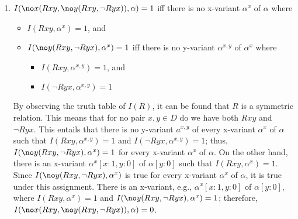 \begin{enumerate}
\item
$I(\no x (Rxy, \no y (Rxy, \neg Ryx)), \alpha) = 1$ iff there is no x-variant $\alpha^x$ of $\alpha$ where
\vspace{-\parskip}
\begin{itemize}[noitemsep, leftmargin=*]
\item $I(Rxy, \alpha^x) = 1$, and
\item $I(\no y (Rxy, \neg Ryx), \alpha^x) = 1$ iff there is no y-variant $\alpha^{x,y}$ of $\alpha^x$ where
   \begin{itemize}[topsep=-\parskip, noitemsep, leftmargin=*]
   \item $I(Rxy, \alpha^{x,y}) = 1$, and
   \item $I(\neg Ryx, \alpha^{x,y}) = 1$
   \end{itemize}
\end{itemize}
By observing the truth table of $I(R)$, it can be found that $R$ is a symmetric relation. This means that for no pair $x,y \in D$ do we have both $Rxy$ and $\neg Ryx$. This entails that there is no y-variant $a^{x,y}$ of every x-variant $\alpha^x$ of $\alpha$ such that $I(Rxy, \alpha^{x,y}) = 1$ and $I(\neg Ryx, \alpha^{x,y}) = 1$; thus, $I(\no y (Rxy, \neg Ryx), \alpha^x) = 1$ for every x-variant $\alpha^x$ of $\alpha$. On the other hand, there is an x-variant $\alpha^x[x:1,y:0]$ of $\alpha[y:0]$ such that $I(Rxy, \alpha^x) = 1$. Since $I(\no y (Rxy, \neg Ryx), \alpha^x)$ is true for every x-variant $\alpha^x$ of $\alpha$, it is true under this assignment. There is an x-variant, e.g., $\alpha^x[x:1,y:0]$ of $\alpha[y:0]$, where $I(Rxy, \alpha^x) = 1$ and $I(\no y (Rxy, \neg Ryx), \alpha^x) = 1$; therefore, $I(\no x (Rxy, \no y (Rxy, \neg Ryx)), \alpha) = 0$.


\end{enumerate}
